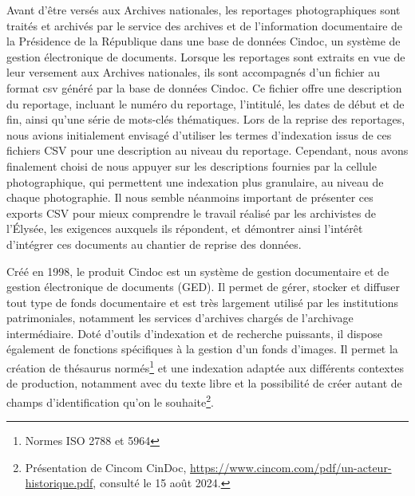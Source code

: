 Avant d’être versés aux Archives nationales, les reportages photographiques sont traités et archivés par le service des archives et de l'information documentaire de la Présidence de la République dans une base de données Cindoc, un système de gestion électronique de documents. Lorsque les reportages sont extraits en vue de leur versement aux Archives nationales, ils sont accompagnés d’un fichier au format \gls{csv} généré par la base de données Cindoc. Ce fichier offre une description du reportage, incluant le numéro du reportage, l’intitulé, les dates de début et de fin, ainsi qu’une série de mots-clés thématiques. Lors de la reprise des reportages, nous avions initialement envisagé d’utiliser les termes d'indexation issus de ces fichiers CSV pour une description au niveau du reportage. Cependant, nous avons finalement choisi de nous appuyer sur les descriptions fournies par la cellule photographique, qui permettent une indexation plus granulaire, au niveau de chaque photographie. Il nous semble néanmoins important de présenter ces exports CSV pour mieux comprendre le travail réalisé par les archivistes de l’Élysée, les exigences auxquels ils répondent, et démontrer ainsi l’intérêt d’intégrer ces documents au chantier de reprise des données.

Créé en 1998, le produit Cindoc est un système de gestion documentaire et de gestion électronique de documents (GED). Il permet de gérer, stocker et diffuser tout type de fonds documentaire et est très largement utilisé par les institutions patrimoniales, notamment les services d’archives chargés de l’archivage intermédiaire. Doté d’outils d’indexation et de recherche puissants, il dispose également de fonctions spécifiques à la gestion d’un fonds d’images. Il permet la création de thésaurus normés\footnote{Normes ISO 2788 et 5964} et une indexation adaptée aux différents contextes de production, notamment avec du texte libre et la possibilité de créer autant de champs d’identification qu’on le souhaite\footnote{Présentation de Cincom CinDoc, \url{https://www.cincom.com/pdf/un-acteur-historique.pdf}, consulté le 15 août 2024.}. 

